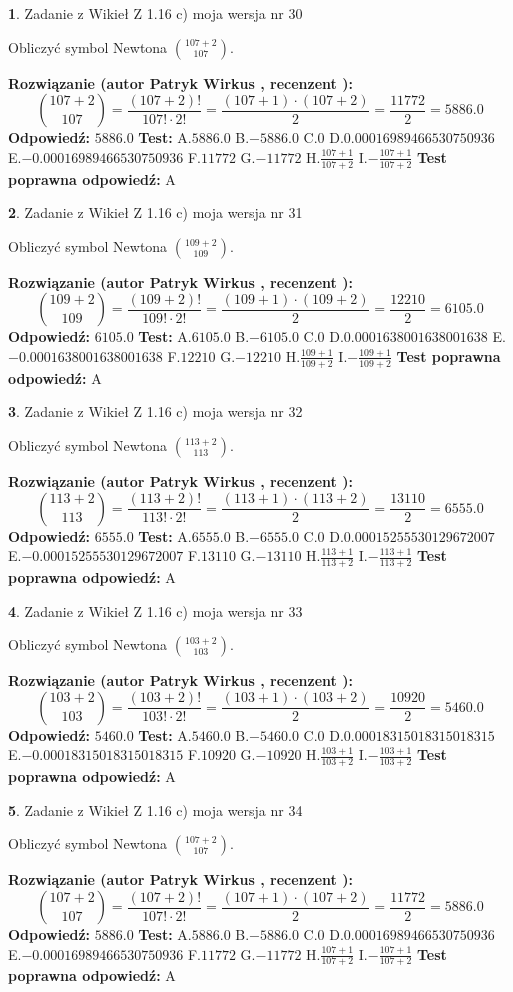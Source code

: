 \documentclass[12pt, a4paper]{article}
\theoremstyle{definition} %
\newtheorem{zad}{}
\newcommand{\zadStart}[1]{\begin{zad}#1\newline}
\newcommand{\zadStop}{\end{zad}}
\newcommand{\rozwStart}[2]{\noindent \textbf{Rozwiązanie (autor #1 , recenzent #2): }\newline}
\newcommand{\rozwStop}{\newline}
\newcommand{\odpStart}{\noindent \textbf{Odpowiedź:}\newline}
\newcommand{\odpStop}{\newline}
\newcommand{\testStart}{\noindent \textbf{Test:}\newline}
\newcommand{\testStop}{\newline}
\newcommand{\kluczStart}{\noindent \textbf{Test poprawna odpowiedź:}\newline}
\newcommand{\kluczStop}{\newline}
\begin{document}
\zadStart{Zadanie z Wikieł Z 1.16 c) moja wersja nr 30}

Obliczyć symbol Newtona ${107+2 \choose 107}$.
\zadStop
\rozwStart{Patryk Wirkus}{}
$${107+2 \choose 107} = \frac{(107+2)!}{107! \cdot 2!} = \frac{(107+1)\cdot(107+2)}{2} = \frac{11772}{2} = 5886.0$$
\rozwStop
\odpStart
$5886.0$
\odpStop
\testStart
A.$5886.0$ B.$-5886.0$ C.$0$ D.$0.00016989466530750936$ E.$-0.00016989466530750936$
F.$11772$ G.$-11772$
H.$\frac{107+1}{107+2}$
I.$-\frac{107+1}{107+2}$
\testStop
\kluczStart
A
\kluczStop



\zadStart{Zadanie z Wikieł Z 1.16 c) moja wersja nr 31}

Obliczyć symbol Newtona ${109+2 \choose 109}$.
\zadStop
\rozwStart{Patryk Wirkus}{}
$${109+2 \choose 109} = \frac{(109+2)!}{109! \cdot 2!} = \frac{(109+1)\cdot(109+2)}{2} = \frac{12210}{2} = 6105.0$$
\rozwStop
\odpStart
$6105.0$
\odpStop
\testStart
A.$6105.0$ B.$-6105.0$ C.$0$ D.$0.0001638001638001638$ E.$-0.0001638001638001638$
F.$12210$ G.$-12210$
H.$\frac{109+1}{109+2}$
I.$-\frac{109+1}{109+2}$
\testStop
\kluczStart
A
\kluczStop



\zadStart{Zadanie z Wikieł Z 1.16 c) moja wersja nr 32}

Obliczyć symbol Newtona ${113+2 \choose 113}$.
\zadStop
\rozwStart{Patryk Wirkus}{}
$${113+2 \choose 113} = \frac{(113+2)!}{113! \cdot 2!} = \frac{(113+1)\cdot(113+2)}{2} = \frac{13110}{2} = 6555.0$$
\rozwStop
\odpStart
$6555.0$
\odpStop
\testStart
A.$6555.0$ B.$-6555.0$ C.$0$ D.$0.00015255530129672007$ E.$-0.00015255530129672007$
F.$13110$ G.$-13110$
H.$\frac{113+1}{113+2}$
I.$-\frac{113+1}{113+2}$
\testStop
\kluczStart
A
\kluczStop



\zadStart{Zadanie z Wikieł Z 1.16 c) moja wersja nr 33}

Obliczyć symbol Newtona ${103+2 \choose 103}$.
\zadStop
\rozwStart{Patryk Wirkus}{}
$${103+2 \choose 103} = \frac{(103+2)!}{103! \cdot 2!} = \frac{(103+1)\cdot(103+2)}{2} = \frac{10920}{2} = 5460.0$$
\rozwStop
\odpStart
$5460.0$
\odpStop
\testStart
A.$5460.0$ B.$-5460.0$ C.$0$ D.$0.00018315018315018315$ E.$-0.00018315018315018315$
F.$10920$ G.$-10920$
H.$\frac{103+1}{103+2}$
I.$-\frac{103+1}{103+2}$
\testStop
\kluczStart
A
\kluczStop



\zadStart{Zadanie z Wikieł Z 1.16 c) moja wersja nr 34}

Obliczyć symbol Newtona ${107+2 \choose 107}$.
\zadStop
\rozwStart{Patryk Wirkus}{}
$${107+2 \choose 107} = \frac{(107+2)!}{107! \cdot 2!} = \frac{(107+1)\cdot(107+2)}{2} = \frac{11772}{2} = 5886.0$$
\rozwStop
\odpStart
$5886.0$
\odpStop
\testStart
A.$5886.0$ B.$-5886.0$ C.$0$ D.$0.00016989466530750936$ E.$-0.00016989466530750936$
F.$11772$ G.$-11772$
H.$\frac{107+1}{107+2}$
I.$-\frac{107+1}{107+2}$
\testStop
\kluczStart
A
\kluczStop
\end{document}
